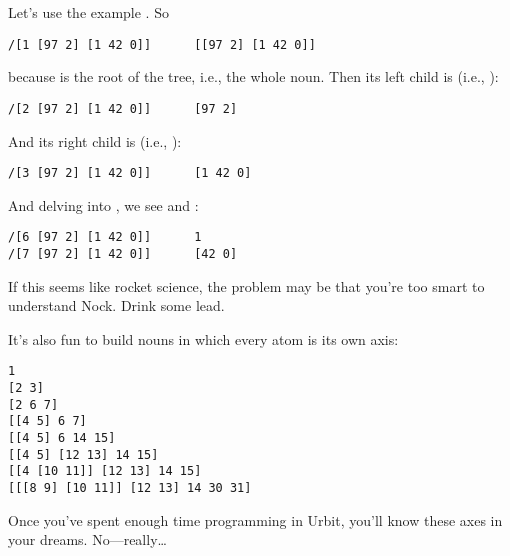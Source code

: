 Let's use the example \kode{[[97 2] [1 42 0]]}.  So

\begin{framed_shaded}
\begin{Verbatim}[fontsize=\relsize{-2.5},fontseries=b,commandchars=\\\{\}]
/[1 [97 2] [1 42 0]]      [[97 2] [1 42 0]]
\end{Verbatim}
\end{framed_shaded}

because  is the root of the tree, i.e., the whole noun.  Then
its left child is  (i.e., ):

\begin{framed_shaded}
\begin{Verbatim}[fontsize=\relsize{-2.5},fontseries=b,commandchars=\\\{\}]
/[2 [97 2] [1 42 0]]      [97 2]
\end{Verbatim}
\end{framed_shaded}

And its right child is  (i.e., ):

\begin{framed_shaded}
\begin{Verbatim}[fontsize=\relsize{-2.5},fontseries=b,commandchars=\\\{\}]
/[3 [97 2] [1 42 0]]      [1 42 0]
\end{Verbatim}
\end{framed_shaded}

And delving into , we see  and :

\begin{framed_shaded}
\begin{Verbatim}[fontsize=\relsize{-2.5},fontseries=b,commandchars=\\\{\}]
/[6 [97 2] [1 42 0]]      1
/[7 [97 2] [1 42 0]]      [42 0]
\end{Verbatim}
\end{framed_shaded}

If this seems like rocket science, the problem may be that you're
too smart to understand Nock.  Drink some lead.

It's also fun to build nouns in which every atom is its own axis:

\begin{framed_shaded}
\begin{Verbatim}[fontsize=\relsize{-2.5},fontseries=b,commandchars=\\\{\}]
1
[2 3]
[2 6 7]
[[4 5] 6 7]
[[4 5] 6 14 15]
[[4 5] [12 13] 14 15]
[[4 [10 11]] [12 13] 14 15]
[[[8 9] [10 11]] [12 13] 14 30 31]
\end{Verbatim}
\end{framed_shaded}

Once you've spent enough time programming in Urbit, you'll know
these axes in your dreams.  No---really\ldots{}